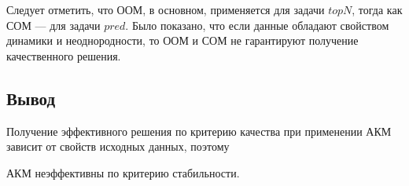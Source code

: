 Следует отметить, что ООМ, в основном, применяется для задачи $topN$, тогда как
СОМ --- для задачи $pred$. Было показано, что если данные обладают
свойством динамики и неоднородности, то ООМ и СОМ не гарантируют получение
качественного решения.



\subsection{Вывод}
Получение эффективного решения по критерию качества при применении
АКМ зависит от свойств исходных данных, поэтому
\begin{assert}
	\label{input-props-kf}
	АКМ неэффективны по критерию стабильности.
\end{assert}



%
%



